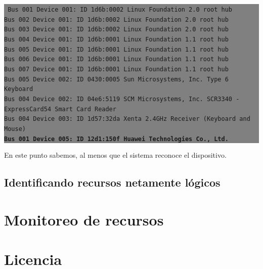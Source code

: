 \documentclass[12pt]{article}
\begin{document}
\colorbox{grey}{\parbox[t]{0.95\linewidth}{ \vspace*{0.5cm} { 
{\tt
Bus 001 Device 001: ID 1d6b:0002 Linux Foundation 2.0 root hub\\
Bus 002 Device 001: ID 1d6b:0002 Linux Foundation 2.0 root hub\\
Bus 003 Device 001: ID 1d6b:0002 Linux Foundation 2.0 root hub\\
Bus 004 Device 001: ID 1d6b:0001 Linux Foundation 1.1 root hub\\
Bus 005 Device 001: ID 1d6b:0001 Linux Foundation 1.1 root hub\\
Bus 006 Device 001: ID 1d6b:0001 Linux Foundation 1.1 root hub\\
Bus 007 Device 001: ID 1d6b:0001 Linux Foundation 1.1 root hub\\
Bus 005 Device 002: ID 0430:0005 Sun Microsystems, Inc. Type 6 Keyboard\\
Bus 004 Device 002: ID 04e6:5119 SCM Microsystems, Inc. SCR3340 - ExpressCard54 Smart Card Reader\\
Bus 004 Device 003: ID 1d57:32da Xenta 2.4GHz Receiver (Keyboard and Mouse)\\
\textbf{Bus 001 Device 005: ID 12d1:150f Huawei Technologies Co., Ltd.}
}
} \vspace*{0.5cm} } } 

En este punto sabemos, al menos que el sistema reconoce el dispositivo. 




\subsection*{Identificando recursos netamente lógicos}

\section*{Monitoreo de recursos}


\section*{Licencia}
\end{document}
